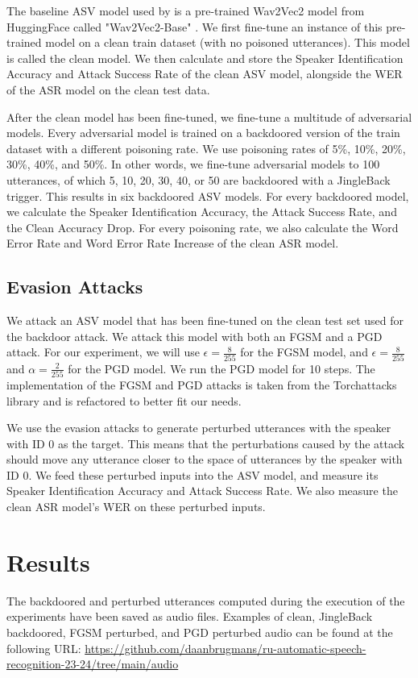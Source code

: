 \documentclass[11pt]{article}
\begin{document}
The baseline ASV model used by \citeauthor{roddeman2024anonymization} is a pre-trained Wav2Vec2 model \citep{baevski2020wav2vec2} from HuggingFace called "Wav2Vec2-Base" \citep{facebook2021huggingface}.
We first fine-tune an instance of this pre-trained model on a clean train dataset (with no poisoned utterances).
This model is called the clean model.
We then calculate and store the Speaker Identification Accuracy and Attack Success Rate of the clean ASV model, alongside the WER of the ASR model on the clean test data.

After the clean model has been fine-tuned, we fine-tune a multitude of adversarial models.
Every adversarial model is trained on a backdoored version of the train dataset with a different poisoning rate.
We use poisoning rates of 5\%, 10\%, 20\%, 30\%, 40\%, and 50\%.
In other words, we fine-tune adversarial models to 100 utterances, of which 5, 10, 20, 30, 40, or 50 are backdoored with a JingleBack trigger.
This results in six backdoored ASV models.
For every backdoored model, we calculate the Speaker Identification Accuracy, the Attack Success Rate, and the Clean Accuracy Drop.
For every poisoning rate, we also calculate the Word Error Rate and Word Error Rate Increase of the clean ASR model.

\subsection{Evasion Attacks}
We attack an ASV model that has been fine-tuned on the clean test set used for the backdoor attack.
We attack this model with both an FGSM \citep{goodfellow2015explaining} and a PGD \citep{madry2018towards} attack.
For our experiment, we will use $\epsilon = \frac{8}{255}$ for the FGSM model, and $\epsilon = \frac{8}{255}$ and $\alpha = \frac{2}{255}$ for the PGD model.
We run the PGD model for 10 steps.
The implementation of the FGSM and PGD attacks is taken from the Torchattacks \citep{kim2020torchattacks} library and is refactored to better fit our needs.

We use the evasion attacks to generate perturbed utterances with the speaker with ID 0 as the target.
This means that the perturbations caused by the attack should move any utterance closer to the space of utterances by the speaker with ID 0.
We feed these perturbed inputs into the ASV model, and measure its Speaker Identification Accuracy and Attack Success Rate.
We also measure the clean ASR model's WER on these perturbed inputs.

\section{Results}
The backdoored and perturbed utterances computed during the execution of the experiments have been saved as audio files.
Examples of clean, JingleBack backdoored, FGSM perturbed, and PGD perturbed audio can be found at the following URL: \url{https://github.com/daanbrugmans/ru-automatic-speech-recognition-23-24/tree/main/audio}
\end{document}
